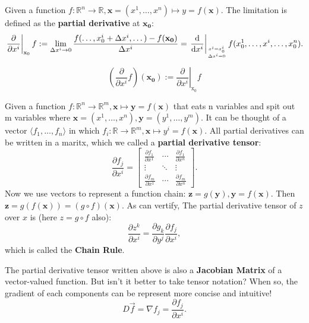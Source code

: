\begin{definition} 
	Given a function $f: \mathbb{R}^n\to\mathbb{R}, \mathbf{x}=(x^1,\dots,x^n)\mapsto y=f(\mathbf{x})$. The limitation is defined as the \textbf{partial derivative} at $\mathbf{x_0}$:
	\[
		\left.\frac{\partial}{\partial x^i}\right|_{\mathrm{x_0}} f:=
		\lim_{\Delta x^i\to 0}\frac{f(\dots,x_0^i+\Delta x^i,\dots)-f(\mathbf{x_0})}{\Delta x^i}=
		\left.\frac{\mathrm{d}}{\mathrm{d}x^i}\right|_{x^i=x_0^i\atop\Delta x^i=0} f(x_0^1,\dots,x^i,\dots,x_0^n).
	\]
\end{definition}

\begin{definition}
	\[
		\left(\frac{\partial}{\partial x^i}f\right)(\mathbf{x_0}):=
		\left.\frac{\partial}{\partial x^i}\right|_{\mathrm{x_0}} f
	\]
\end{definition}

\begin{theorem}
	Given a function $f: \mathbb{R}^n\to\mathbb{R}^m, \mathbf{x}\mapsto\mathbf{y}=f(\mathbf{x})$ that eats n variables and spit out m variables where $\mathbf{x}=(x^1,\dots,x^n), \mathbf{y}=(y^1,\dots,y^m)$.
	It can be thought of a vector $\langle f_1,\dots,f_n\rangle$ in which $f_i: \mathbb{R}\to\mathbb{R}^m, \mathbf{x}\mapsto y^i=f(\mathbf{x})$.
	All partial derivatives can be written in a maritx, which we called a \textbf{partial derivative tensor}:
	\[
		\frac{\partial f_j}{\partial x^i} = 
		\begin{bmatrix}
			\frac{\partial f_1}{\partial x^1} & \cdots & \frac{\partial f_1}{\partial x^n} \\
			\vdots & \ddots & \vdots \\
			\frac{\partial f_m}{\partial x^1} & \cdots & \frac{\partial f_m}{\partial x^n}
		\end{bmatrix}.
	\]
	Now we use vectors to represent a function chain: $\mathbf{z}=g(\mathbf{y}), \mathbf{y}=f(\mathbf{x})$. Then $\mathbf{z}=g(f(\mathbf{x}))=(g\circ f)(\mathbf{x})$. As can vertify,
	The partial derivative tensor of $z$ over $x$ is (here $z=g\circ f$ also):
	\[
		\frac{\partial z^k}{\partial x^i} = \frac{\partial g_k}{\partial y^j}\frac{\partial f_j}{\partial x^i},
	\]
	which is called the \textbf{Chain Rule}.
\end{theorem}

The partial derivative tensor written above is also a \textbf{Jacobian Matrix} of a vector-valued function. But isn't it better to take tensor notation?
When so, the gradient of each components can be represent more concise and intuitive!
\[
	D\vec{f} = \nabla f_j = \frac{\partial f_j}{\partial x^i}.
\]

